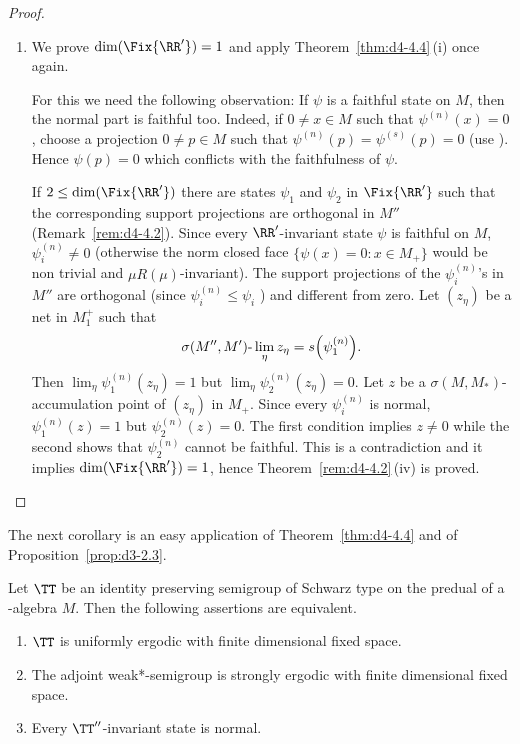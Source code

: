 \begin{proof}
\begin{enumerate}[\upshape (i), wide, labelindent=.25em]
\item
We prove $ \dim(\Fix{\RR'}) = 1 $  and apply Theorem~\ref{thm:d4-4.4}\,(i) once again.

For this we need the following observation: If\/ $ \psi $  is a faithful state on $ M $,  then the normal part is faithful too.
Indeed, if\/ $ 0 \neq x \in M $  such that $ \psi^{(n)}(x) = 0 $,  choose a projection $ 0 \neq p \in M $  such that $ \psi^{(n)}(p) = \psi^{(s)}(p) = 0 $ (use \textcite[Theorem III.3.8]{takesaki:1979}). 
Hence $ \psi(p) = 0 $  which conflicts with the faithfulness of\/ $ \psi $.

If\/ $ 2 \leq \dim (\Fix{\RR'}) $  there are states $ \psi_{1} $  and $ \psi_{2} $  in $ \Fix{\RR'} $  such that the corresponding support projections are orthogonal in $ M'' $  (Remark~\ref{rem:d4-4.2}).
Since every $ \RR' $-invariant state $ \psi $  is faithful on $ M $, $ \psi_{i}^{(n)} \neq 0 $  (otherwise the norm closed face $ \{\psi(x) = 0: x \in M_{+}\} $  would
be non trivial and $ \mu R(\mu) $-invariant).
The support projections of the $ \psi_{i}^{(n)} $'s in $ M'' $  are orthogonal (since $ \psi_{i}^{(n)} \leq \psi_{i} $ ) and different from zero.
Let $ (z_{\eta}) $  be a net in $ M_{1}^{+} $  such that
\[
	\sigma(M'',M')\text{-}\lim_{\eta} z_{\eta} = s\mleft(\psi_{1}^{(n)}\mright).
\]
Then $ \lim_{\eta} \psi_{1}^{(n)}(z_{\eta}) = 1 $  but $ \lim_{\eta} \psi_{2}^{(n)}(z_{\eta}) = 0 $.
Let $ z $  be a $ \sigma(M,M_{*}) $-accumulation point of\/ $ (z_{\eta}) $  in $ M_{+} $.
Since every $ \psi_{i}^{(n)} $  is normal, $ \psi_{1}^{(n)}(z) = 1 $  but $ \psi_{2}^{(n)}(z) = 0 $.
The first condition implies $ z \neq 0 $  while the second shows that $ \psi_{2}^{(n)} $  cannot be faithful.
This is a contradiction and it implies $ \dim( \Fix{\RR'}) = 1 $, hence Theorem~\ref{rem:d4-4.2}\,(iv) is proved.
\end{enumerate}
\end{proof}
The next corollary is an easy application of\/ Theorem~\ref{thm:d4-4.4} and of Proposition~\ref{prop:d3-2.3}.
\begin{corollary}\label{cor:d4-4.5}
Let $ \TT $  be an identity preserving semigroup of Schwarz type on the predual of a \WA-algebra $ M $.
Then the following assertions are equivalent.
\begin{enumerate}[\upshape (a)]
\item
$ \TT $  is uniformly ergodic with finite dimensional fixed space.

\item
The adjoint weak*-semigroup is strongly ergodic with finite dimensional fixed space.

\item
Every $ \TT'' $-invariant state is normal.
\end{enumerate}
\end{corollary}

